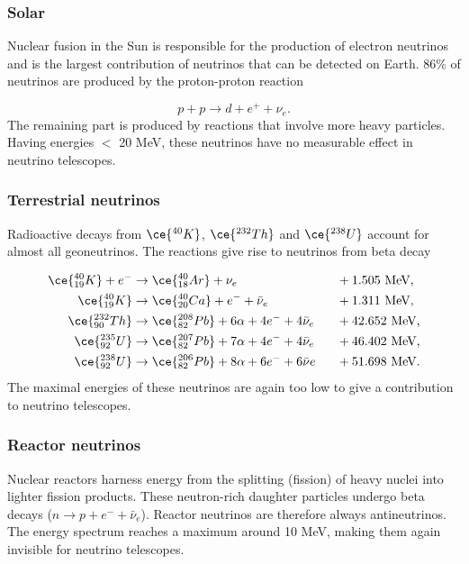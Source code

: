 \subsubsection{Solar}
Nuclear fusion in the Sun is responsible for the production of electron neutrinos and is the largest contribution of neutrinos that can be detected on Earth. 86\% of neutrinos are produced by the proton-proton reaction

\begin{equation}
p + p \rightarrow d + e^+ + \nu_e.
\end{equation}
The remaining part is produced by reactions that involve more heavy particles. Having energies $<$ 20 MeV, these neutrinos have no measurable effect in neutrino telescopes.
\subsubsection{Terrestrial neutrinos}
Radioactive decays from $\ce{^{40}K}$, $\ce{^{232}Th}$ and $\ce{^{238}U}$ account for almost all geoneutrinos. The reactions give rise to neutrinos from beta decay \cite{Wan:2016nhe}

\begin{alignat}{2}
\ce{^{40}_{19}K} + e^- &\rightarrow \ce{^{40}_{18}Ar} + \nu_e \ \ &&+1.505 \textrm{ MeV,}\\
\ce{^{40}_{19}K} &\rightarrow \ce{^{40}_{20}Ca} +e^- + \bar{\nu}_e \ \ &&+1.311 \textrm{ MeV,}\\
\ce{^{232}_{90}Th} &\rightarrow \ce{^{208}_{82}Pb} +6\alpha + 4e^- +4\bar{\nu}_e\ \ &&+42.652 \textrm{ MeV,} \\
\ce{^{235}_{92}U} &\rightarrow \ce{^{207}_{82}Pb} + 7\alpha + 4e^- + 4\bar{\nu}_e \ \ &&+46.402 \textrm{ MeV,}\\
\ce{^{238}_{92}U} &\rightarrow \ce{^{206}_{82}Pb} +8\alpha +6e^- + 6\bar{\nu}e \ \ &&+51.698 \textrm{ MeV.}
\end{alignat}
The maximal energies of these neutrinos are again too low to give a contribution to neutrino telescopes.
\subsubsection{Reactor neutrinos}
Nuclear reactors harness energy from the splitting (fission) of heavy nuclei into lighter fission products. These neutron-rich daughter particles undergo beta decays ($n \rightarrow p+e^-+\bar{\nu}_e$). Reactor neutrinos are therefore always antineutrinos. The energy spectrum reaches a maximum around 10 MeV, making them again invisible for neutrino telescopes. 


